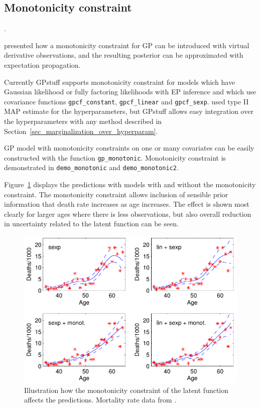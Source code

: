 \documentclass[twoside,11pt]{article}
\newcommand{\code}[1]{{\normalfont\texttt{#1}}}
\begin{document}
\subsection{Monotonicity constraint}
\label{sec_monotonic}.

\citet{Riihimaki+Vehtari:2010} presented how a monotonicity constraint
for GP can be introduced with virtual derivative observations, and
the resulting posterior can be approximated with expectation
propagation.

Currently GPstuff supports monotonicity constraint for models which
have Gaussian likelihood or fully factoring likelihoods with EP
inference and which use covariance functions \code{gpcf\_constant},
\code{gpcf\_linear} and
\code{gpcf\_sexp}. \citet{Riihimaki+Vehtari:2010} used type II MAP
estimate for the hyperparameters, but GPstuff allows easy integration
over the hyperparameters with any method described in
Section~\ref{sec_marginalization_over_hyperparam}.

GP model with monotonicity constraints on one or many covariates can
be easily constructed with the function
\code{gp\_monotonic}. Monotonicity constraint is demonstrated in
\code{demo\_monotonic} and \code{demo\_monotonic2}.

Figure~\ref{monotonicity} displays the predictions with models with
and without the monotonicity constraint. The monotonicity constraint
allows inclusion of sensible prior information that death rate
increases as age increases. The effect is shown most clearly for
larger ages where there is less observations, but also overall reduction in
uncertainty related to the latent function can be seen.

\begin{figure}
  \begin{center}       
      \includegraphics[]{demo_monotonic2_fig1.pdf}  
    \end{center}\caption{Illustration how the monotonicity constraint
      of the latent function affects the predictions. Mortality rate
      data from \citet{Broffitt:1988}.}
  \label{monotonicity} 
\end{figure}
\end{document}
